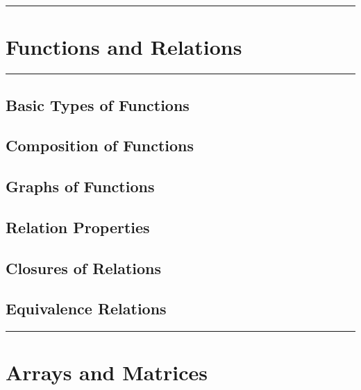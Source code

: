\documentclass[]{book}
\begin{document}
\begin{center}\rule{0.5\linewidth}{\linethickness}\end{center}

\chapter{Functions and Relations}\label{functions-and-relations}

\begin{center}\rule{0.5\linewidth}{\linethickness}\end{center}

\section{Basic Types of Functions}\label{basic-types-of-functions}

\section{Composition of Functions}\label{composition-of-functions}

\section{Graphs of Functions}\label{graphs-of-functions}

\section{Relation Properties}\label{relation-properties}

\section{Closures of Relations}\label{closures-of-relations}

\section{Equivalence Relations}\label{equivalence-relations}

\begin{center}\rule{0.5\linewidth}{\linethickness}\end{center}

\chapter{Arrays and Matrices}\label{arrays-and-matrices}
\end{document}
